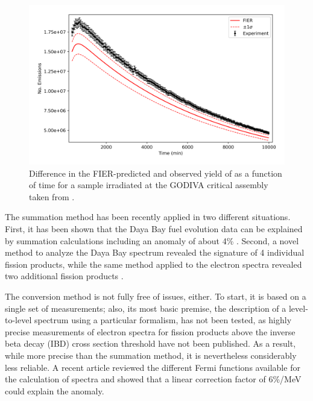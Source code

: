 \documentclass[letterpaper]{ar-1col}
\begin{document}
\begin{figure}[b]
 \centering
 \includegraphics[width=0.7\linewidth]{667_before_v2.png}

 \caption{Difference in the FIER-predicted and observed yield of  as a function of time for a  sample irradiated at the GODIVA critical assembly taken from \cite{Matthews2018}.  }
 \label{fig:fier_plot}
\end{figure}

The summation method has been recently applied in two different situations.
  First, it has been shown that the Daya Bay fuel evolution data \cite{An17} can be explained by summation calculations including an anomaly of about 4\% \cite{Hay18}.
  Second, a novel method to analyze the Daya Bay spectrum revealed the signature of 4 individual fission products, while the same method applied to the electron spectra revealed two additional fission products \cite{Son18}.
  

The conversion method is not fully free of issues, either.
 To start, it is based on a single set of measurements; also, its most basic premise, the description of a level-to-level spectrum using a particular formalism, has not been tested, as highly precise measurements of electron spectra for fission products above the inverse beta decay (IBD) cross section threshold have not been published.
   As a result, while more precise than the summation method, it is nevertheless considerably less reliable.
    A recent article \cite{Son17} reviewed the different Fermi functions available for the calculation of spectra and showed that a linear correction factor of 6\%/MeV could explain the anomaly.
\end{document}
